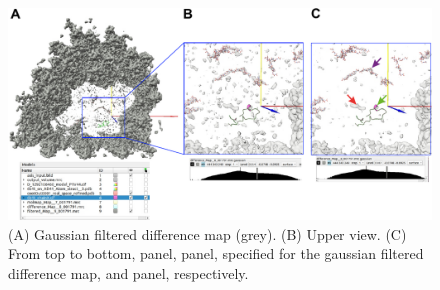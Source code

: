 \begin{itemize}
                            \begin{figure}[H]
                            \centering 
                            \captionsetup{width=.9\linewidth} 
                            \includegraphics[width=.9\textwidth]{Images_appendix/Fig315.pdf}
                            \caption{(A) Gaussian filtered difference map (grey). (B) Upper view. (C) From top to bottom, \chimera {} panel,  panel, specified for the gaussian filtered difference map, and  panel, respectively.}  
                            \label{fig:app_usecase_mapsubtract_6}
                            \end{figure}
                
\end{itemize}
